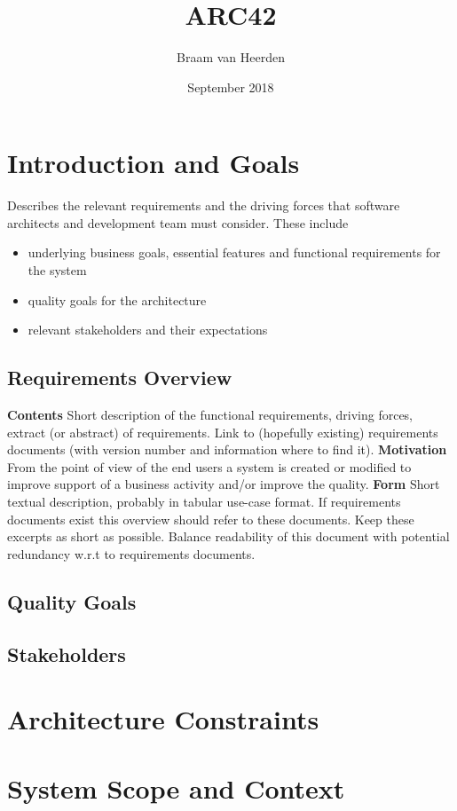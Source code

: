 \documentclass[a4paper]{paper}
\title{ARC42}
\author{Braam van Heerden}
\date{September 2018}
\begin{document}
\maketitle

\newpage\section{Introduction and Goals}
Describes the relevant requirements and the driving forces that software architects and development team must consider. These include
\begin{itemize}
    \item underlying business goals, essential features and functional requirements for the system
    \item quality goals for the architecture
    \item relevant stakeholders and their expectations
\end{itemize}
\subsection{Requirements Overview}
\textbf{Contents}\newline
Short description of the functional requirements, driving forces, extract (or abstract) of requirements. Link to (hopefully existing) requirements documents (with version number and information where to find it).\newline\newline
\textbf{Motivation}\newline
From the point of view of the end users a system is created or modified to improve support of a business activity and/or improve the quality.\newline\newline
\textbf{Form}\newline
Short textual description, probably in tabular use-case format. If requirements documents exist this overview should refer to these documents.
Keep these excerpts as short as possible. Balance readability of this document with potential redundancy w.r.t to requirements documents.
\subsection{Quality Goals}
\subsection{Stakeholders}
\newpage\section{Architecture Constraints}
\newpage\section{System Scope and Context}
\end{document}
